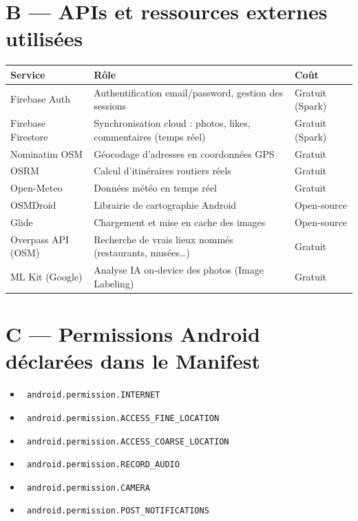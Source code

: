 \documentclass[a4paper,12pt,openany]{report}
\newcommand{\ic}[1]{\texttt{\small\colorbox{lightbg}{\color{navy!90} #1}}}
\begin{document}
\section*{B — APIs et ressources externes utilisées}

\begin{tabularx}{\textwidth}{l X l}
  \toprule
  \textbf{Service} & \textbf{Rôle} & \textbf{Coût} \\
  \midrule
  Firebase Auth      & Authentification email/password, gestion des sessions
                     & Gratuit (Spark) \\
  Firebase Firestore & Synchronisation cloud : photos, likes, commentaires (temps réel)
                     & Gratuit (Spark) \\
  Nominatim OSM      & Géocodage d'adresses en coordonnées GPS
                     & Gratuit \\
  OSRM               & Calcul d'itinéraires routiers réels
                     & Gratuit \\
  Open-Meteo         & Données météo en temps réel
                     & Gratuit \\
  OSMDroid           & Librairie de cartographie Android
                     & Open-source \\
  Glide              & Chargement et mise en cache des images
                     & Open-source \\
  Overpass API (OSM) & Recherche de vrais lieux nommés (restaurants, musées…)
                     & Gratuit \\
  ML Kit (Google)    & Analyse IA on-device des photos (Image Labeling)
                     & Gratuit \\
  \bottomrule
\end{tabularx}

\section*{C — Permissions Android déclarées dans le Manifest}

\begin{itemize}
  \item \ic{android.permission.INTERNET}
  \item \ic{android.permission.ACCESS\_FINE\_LOCATION}
  \item \ic{android.permission.ACCESS\_COARSE\_LOCATION}
  \item \ic{android.permission.RECORD\_AUDIO}
  \item \ic{android.permission.CAMERA}
  \item \ic{android.permission.POST\_NOTIFICATIONS}
\end{itemize}
\end{document}
